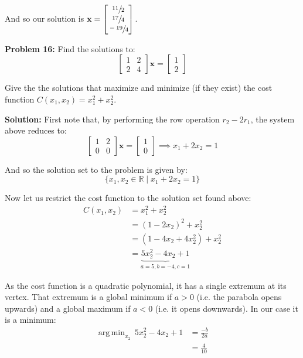 \documentclass{article}
\renewcommand\vec{\mathbf}
\DeclareMathOperator*{\argmin}{arg\,min}
\begin{document}
And so our solution is $\vec x=\begin{bmatrix}
    \sfrac{11}{2} \\
    \sfrac{17}{4} \\
    \sfrac{-19}{4}
\end{bmatrix}$.
\bigskip

\noindent\textbf{Problem 16:} Find the solutions to:
\begin{equation*}
    \begin{bmatrix}
        1&2\\2&4
    \end{bmatrix}\vec x=\begin{bmatrix}
        1\\2
    \end{bmatrix}
\end{equation*}

Give the the solutions that maximize and minimize (if they exist) the cost function $C(x_1,x_2)=x_1^2+x_2^2$.
\bigskip

\noindent\textbf{Solution:} First note that, by performing the row operation $r_2-2r_1$, the system above reduces to:
\begin{equation*}
    \begin{bmatrix}
        1&2\\0&0
    \end{bmatrix}\vec x=\begin{bmatrix}
        1\\0
    \end{bmatrix}\implies x_1+2x_2=1
\end{equation*}

And so the solution set to the problem is given by:
\begin{equation*}
    \{x_1,x_2\in\mathbb R\mid x_1+2x_2=1\}
\end{equation*}

Now let us restrict the cost function to the solution set found above:
\begin{align*}
    C(x_1,x_2)&=x_1^2+x_2^2\\
    &=(1-2x_2)^2+x_2^2\tag{$x_1+2x_2=1\implies x_1=1-2x_2$}\\
    &=(1-4x_2+4x_2^2)+x_2^2\\
    &=\underbrace{5x_2^2-4x_2+1}_{a=5,b=-4,c=1}
\end{align*}

As the cost function is a quadratic polynomial, it has a single extremum at its vertex. That extremum is a global minimum if $a>0$ (i.e. the parabola opens upwards) and a global maximum if $a<0$ (i.e. it opens downwards). In our case it is a minimum:
\begin{align*}
    \argmin_{x_2}\,5x_2^2-4x_2+1&=\frac{-b}{2a}\tag{vertex of quadratic w/ $a>0$}\\
    &=\frac{4}{10}
\end{align*}
\end{document}
